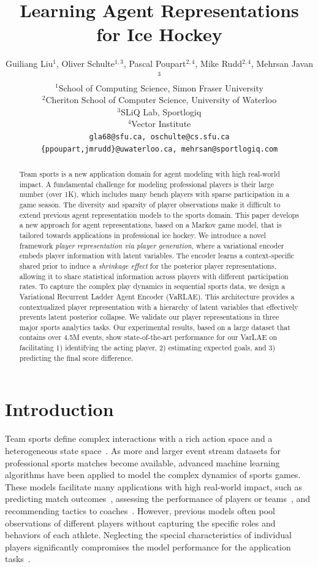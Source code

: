 \documentclass{article}
\title{Learning Agent Representations for Ice Hockey}
\author{Guiliang Liu$^{1}$, Oliver Schulte$^{1,3}$, Pascal Poupart$^{2,4}$, Mike Rudd$^{2,4}$, Mehrsan Javan$^{3}$\\
$^{1}$School of Computing Science, Simon Fraser University\\
$^{2}$Cheriton School of Computer Science, University of Waterloo\\
$^{3}$SLiQ Lab, Sportlogiq\\
$^{4}$Vector Institute \\
\texttt{gla68@sfu.ca, oschulte@cs.sfu.ca}\\
\texttt{\{ppoupart,jmrudd\}@uwaterloo.ca, mehrsan@sportlogiq.com}
}
\begin{document}
\maketitle

\begin{abstract}
  Team sports is a new application domain for agent modeling with high real-world impact. A fundamental challenge for modeling professional players is their large number (over 1K), which includes many bench players with sparse participation in a game season. The diversity and sparsity of player observations make it difficult to extend previous agent representation models to the sports domain. This paper develops a new approach for agent representations, based on a Markov game model, that is tailored towards applications in professional ice hockey. We introduce a novel framework {\it player representation via player generation}, where a variational encoder embeds player information with latent variables. The encoder learns a context-specific shared prior to induce a {\it shrinkage effect} for the posterior player representations, allowing it to share statistical information across players with different participation rates. To capture the complex play dynamics in sequential sports data, we design a Variational Recurrent Ladder Agent Encoder (VaRLAE).  This architecture provides  a contextualized player representation with a hierarchy of latent variables that effectively prevents latent posterior collapse. We validate our player representations in three
  major sports analytics tasks. Our experimental results, based on a large dataset that contains over 4.5M events, show state-of-the-art performance for our VarLAE on facilitating 1) identifying the acting player, 2) estimating expected goals, and 3) predicting the final score difference.
\end{abstract}

\section{Introduction}
Team sports define complex interactions with a rich action space and a heterogeneous state space~\cite{Gudmundsson17TeamSports}. 
As more and larger event stream datasets for professional sports matches become available, advanced machine learning algorithms have been applied to model the complex dynamics of sports games. These models facilitate many applications with high real-world impact, such as predicting match outcomes~\cite{bunker2019machine}, assessing the performance of players or teams~\cite{Liu2018,decroos2018action,schulte2017markov,Liu2020DeepSoccer}, and recommending tactics to coaches~\cite{schwartz}. 
However, previous models often pool observations of different players without capturing the specific roles and behaviors of each athlete. Neglecting the special characteristics of individual players significantly compromises the  model performance for the application tasks~\cite{ganguly2018problem}.
\end{document}
